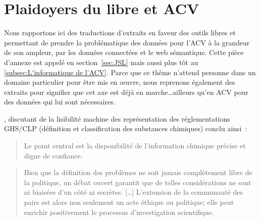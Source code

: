 \section{Plaidoyers du libre et ACV}
\label{sec:Plaidoyers du libre dans l'ACV}

Nous rapportons ici des traductions d'extraits en faveur des outils libres et permettant de prendre la problématique des données pour l'\gls{ACV} à la grandeur de son ampleur, par les données connectées et le web sémantique.
Cette pièce d'annexe est appelé en section~\ref{sec:JSL} mais aussi plus tôt au \ref{subsec:L'informatique de l'ACV}.
Parce que ce thème n'attend personne dans un domaine particulier pour être mis en œuvre, nous reprenons également des extraits pour signifier que cet axe est déjà en marche\ldots ailleurs qu'en ACV pour des données qui lui sont nécessaires.

  
\citeauthor{borkum_health_2014}, discutant de la lisibilité machine des représentation des réglementations GHS/CLP (définition et classification des substances chimiques) conclu ainsi~:
\blockcquote[traduction de la conclusion]{borkum_health_2014}{
Le point central est la disponibilité de l'information chimique précise et digne de confiance.
}


\blockcquote[traduction]{funtowicz_science_1993}{
Bien que la définition des problèmes ne soit jamais complètement libre de la politique, un débat ouvert garantit que de telles considérations ne sont ni biaisées d'un côté ni secrètes.
[\ldots]
%
%
L'extension de la communauté des pairs est alors non seulement un acte éthique ou politique; elle peut enrichir positivement le processus d'investigation scientifique.
}

